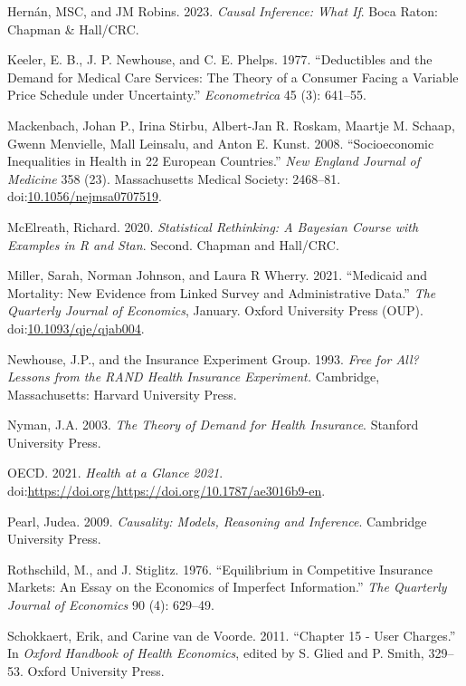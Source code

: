 \documentclass[a4paper,12pt]{article}
\begin{document}
\hypertarget{citeproc_bib_item_14}{Hernán, MSC, and JM Robins. 2023. \textit{Causal Inference: What If}. Boca Raton: Chapman \& Hall/CRC.}

\hypertarget{citeproc_bib_item_15}{Keeler, E. B., J. P. Newhouse, and C. E. Phelps. 1977. “Deductibles and the Demand for Medical Care Services: The Theory of a Consumer Facing a Variable Price Schedule under Uncertainty.” \textit{Econometrica} 45 (3): 641–55.}

\hypertarget{citeproc_bib_item_16}{Mackenbach, Johan P., Irina Stirbu, Albert-Jan R. Roskam, Maartje M. Schaap, Gwenn Menvielle, Mall Leinsalu, and Anton E. Kunst. 2008. “Socioeconomic Inequalities in Health in 22 European Countries.” \textit{New England Journal of Medicine} 358 (23). Massachusetts Medical Society: 2468–81. doi:\href{https://doi.org/10.1056/nejmsa0707519}{10.1056/nejmsa0707519}.}

\hypertarget{citeproc_bib_item_17}{McElreath, Richard. 2020. \textit{Statistical Rethinking: A Bayesian Course with Examples in R and Stan}. Second. Chapman and Hall/CRC.}

\hypertarget{citeproc_bib_item_18}{Miller, Sarah, Norman Johnson, and Laura R Wherry. 2021. “Medicaid and Mortality: New Evidence from Linked Survey and Administrative Data.” \textit{The Quarterly Journal of Economics}, January. Oxford University Press (OUP). doi:\href{https://doi.org/10.1093/qje/qjab004}{10.1093/qje/qjab004}.}

\hypertarget{citeproc_bib_item_19}{Newhouse, J.P., and the Insurance Experiment Group. 1993. \textit{Free for All? Lessons from the RAND Health Insurance Experiment.} Cambridge, Massachusetts: Harvard University Press.}

\hypertarget{citeproc_bib_item_20}{Nyman, J.A. 2003. \textit{The Theory of Demand for Health Insurance}. Stanford University Press.}

\hypertarget{citeproc_bib_item_21}{OECD. 2021. \textit{Health at a Glance 2021}. doi:\url{https://doi.org/https://doi.org/10.1787/ae3016b9-en}.}

\hypertarget{citeproc_bib_item_22}{Pearl, Judea. 2009. \textit{Causality: Models, Reasoning and Inference}. Cambridge University Press.}

\hypertarget{citeproc_bib_item_23}{Rothschild, M., and J. Stiglitz. 1976. “Equilibrium in Competitive Insurance Markets: An Essay on the Economics of Imperfect Information.” \textit{The Quarterly Journal of Economics} 90 (4): 629–49.}

\hypertarget{citeproc_bib_item_24}{Schokkaert, Erik, and Carine van de Voorde. 2011. “Chapter 15 - User Charges.” In \textit{Oxford Handbook of Health Economics}, edited by S. Glied and P. Smith, 329–53. Oxford University Press.}
\end{document}
